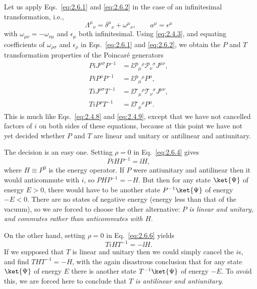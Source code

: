 Let us apply Eqs.~\eqref{eq:2.6.1} and \eqref{eq:2.6.2} in the case of an infinitesimal
transformation, i.e.,
\[
\Lambda^\mu{}_{\nu}=\delta^\mu{}_{\nu}+\omega^\mu{}_{\nu},
\qquad
a^\mu=\epsilon^\mu
\]
with $\omega_{\mu\nu}=-\omega_{\nu\mu}$ and $\epsilon_\mu$ both infinitesimal.
Using \eqref{eq:2.4.3}, and equating coefficients of $\omega_{\rho\sigma}$ and
$\epsilon_\rho$ in Eqs.~\eqref{eq:2.6.1} and \eqref{eq:2.6.2}, we obtain the $P$ and $T$
transformation properties of the Poincar\'e generators
\begin{align}
P iJ^{\rho\sigma}P^{-1}
  &=\ii\mathcal{P}_\mu{}^\rho\mathcal{P}_\nu{}^\sigma J^{\mu\nu},
  \tag{2.6.3}\label{eq:2.6.3}\\
P iP^\rho P^{-1}
  &=\ii\mathcal{P}_\mu{}^\rho P^\mu,
  \tag{2.6.4}\label{eq:2.6.4}\\
T iJ^{\rho\sigma}T^{-1}
  &=\ii\mathcal{T}_\mu{}^\rho\mathcal{T}_\nu{}^\sigma J^{\mu\nu},
  \tag{2.6.5}\label{eq:2.6.5}\\
T iP^\rho T^{-1}
  &=\ii\mathcal{T}_\mu{}^\rho P^\mu.
  \tag{2.6.6}\label{eq:2.6.6}
\end{align}
This is much like Eqs.~\eqref{eq:2.4.8} and \eqref{eq:2.4.9}, except that we have not cancelled
factors of $i$ on both sides of these equations, because at this point we have
not yet decided whether $P$ and $T$ are linear and unitary or antilinear and
antiunitary.

The decision is an easy one. Setting $\rho=0$ in Eq.~\eqref{eq:2.6.4} gives
\[
P iH P^{-1}=\ii H,
\]
where $H\equiv P^0$ is the energy operator. If $P$ were antiunitary and
antilinear then it would anticommute with $i$, so $PHP^{-1}=-H$. But then for
any state $\ket{\Psi}$ of energy $E>0$, there would have to be another state
$P^{-1}\ket{\Psi}$ of energy $-E<0$. There are no states of negative energy
(energy less than that of the vacuum), so we are forced to choose the other
alternative: $P$ \emph{is linear and unitary, and commutes rather than
anticommutes with $H$}.

On the other hand, setting $\rho=0$ in Eq.~\eqref{eq:2.6.6} yields
\[
T iH T^{-1}=-\ii H.
\]
If we supposed that $T$ is linear and unitary then we could simply cancel the
$i$s, and find $THT^{-1}=-H$, with the again disastrous conclusion that for
any state $\ket{\Psi}$ of energy $E$ there is another state
$T^{-1}\ket{\Psi}$ of energy $-E$. To avoid this, we are forced here to
conclude that $T$ \emph{is antilinear and antiunitary}.

